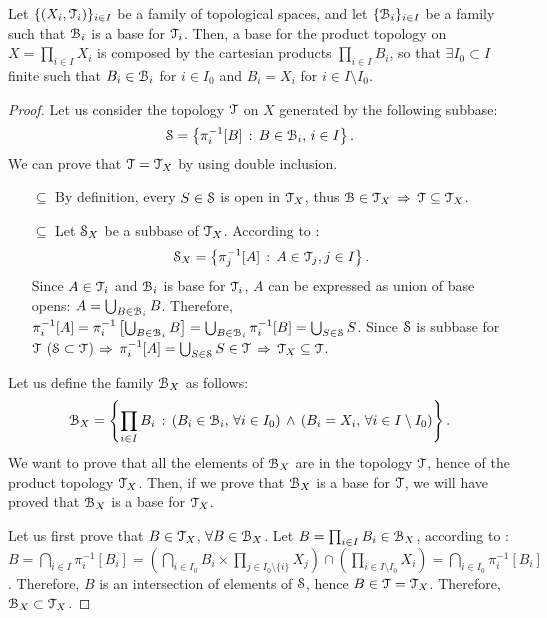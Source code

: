 \begin{theorem}
	\label{th:product-topology-base}
	Let $\{(X_i, \T_i)\}_{i\in I}$ be a family of topological spaces, and let $\{\B_i\}_{i\in I}$ be
	a family such that $\B_i$ is a base for $\T_i$. Then, a base for the product topology
	on $X=\prod_{i\in I} X_i$ is composed by the cartesian products $\prod_{i\in I}B_i$,
	so that $\exists I_0\subset I$ finite such that
	$B_i\in \B_i$ for $i\in I_0$ and $B_i=X_i$ for $i\in I\setminus I_0$.
\end{theorem}

\begin{proof}Let us consider the topology $\T$ on $X$ generated by the following subbase:
	$$
	\S = \setdef{\pi^{-1}_i[B]}{B\in\B_i,\,i\in I}.
	$$
	We can prove that $\T=\T_X$ by using double inclusion.
	\begin{itemize}
		\item[$\boxed{\subseteq}$] By definition, every $S\in \S$ is open in $\T_X$, thus $\B\in \T_X$ $\Then$ $\T\subseteq \T_X$.
		\item[$\boxed{\subseteq}$] Let $\S_X$ be a subbase of $\T_X$. According to :
		$$
			\S_X = \setdef{\pi^{-1}_j[A]}{A\in\T_j, j\in I}.
		$$
		Since $A\in \T_i$ and $\B_i$ is base for $\T_i$, $A$ can be expressed as union of
		base opens: $A=\bigcup_{B\in \B_i} B$. Therefore,
		$\pi^{-1}_i[A] = \pi^{-1}_i\left[\bigcup_{B\in \B_i} B\right] = \bigcup_{B\in \B_i} \pi^{-1}_i[B] = \bigcup_{S\in\S}S$.
		Since $\S$ is subbase for $\T$ ($\S\subset \T$) $\Then$ $\pi^{-1}_i[A]=\bigcup_{S\in\S}S\in \T$ $\Then$ $\T_X\subseteq \T$.
	\end{itemize}
	Let us define the family $\B_X$ as follows:
	$$
		\B_X = \setdef{\prod_{i\in I}B_i}{\left(B_i\in\B_i,\,\forall i\in I_0\right)\,\land\,\left(B_i=X_i,\,\forall i\in I\setminus I_0\right)}.
	$$
	We want to prove that all the elements of $\B_X$ are in the topology $\T$, hence of the product topology $\T_X$.
	Then, if we prove that $\B_X$ is a base for $\T$, we will have proved that $\B_X$ is a base for $\T_X$.

	Let us first prove that $B\in \T_X$, $\forall B\in \B_X$. Let $B=\prod_{i\in I}B_i\in\B_X$, according to :
	$B=\bigcap_{i\in I}\pi^{-1}_i[B_i] = \left(\bigcap_{i\in I_0}B_i\times \prod_{j\in I_0\setminus\{i\}}X_j\right)\cap \left(\prod_{i\in I\setminus I_0}X_i\right)=\bigcap_{i\in I_0} \pi^{-1}_i[B_i]$.
	Therefore, $B$ is an intersection of elements of $\S$, hence $B\in \T = \T_X$. Therefore, $\B_X\subset \T_X$.


\end{proof}
